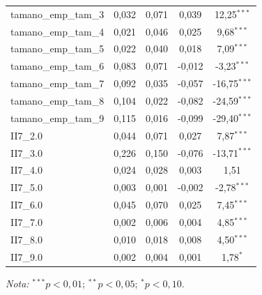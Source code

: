 \begin{table}[H]
\begin{tabular}{lcccc}
tamano\_emp\_tam\_3 & 0,032 & 0,071 & 0,039 & 12,25$^{***}$ \\
tamano\_emp\_tam\_4 & 0,021 & 0,046 & 0,025 & 9,68$^{***}$ \\
tamano\_emp\_tam\_5 & 0,022 & 0,040 & 0,018 & 7,09$^{***}$ \\
tamano\_emp\_tam\_6 & 0,083 & 0,071 & -0,012 & -3,23$^{***}$ \\
tamano\_emp\_tam\_7 & 0,092 & 0,035 & -0,057 & -16,75$^{***}$ \\
tamano\_emp\_tam\_8 & 0,104 & 0,022 & -0,082 & -24,59$^{***}$ \\
tamano\_emp\_tam\_9 & 0,115 & 0,016 & -0,099 & -29,40$^{***}$ \\
II7\_2.0 & 0,044 & 0,071 & 0,027 & 7,87$^{***}$ \\
II7\_3.0 & 0,226 & 0,150 & -0,076 & -13,71$^{***}$ \\
II7\_4.0 & 0,024 & 0,028 & 0,003 & 1,51 \\
II7\_5.0 & 0,003 & 0,001 & -0,002 & -2,78$^{***}$ \\
II7\_6.0 & 0,045 & 0,070 & 0,025 & 7,45$^{***}$ \\
II7\_7.0 & 0,002 & 0,006 & 0,004 & 4,85$^{***}$ \\
II7\_8.0 & 0,010 & 0,018 & 0,008 & 4,50$^{***}$ \\
II7\_9.0 & 0,002 & 0,004 & 0,001 & 1,78$^{*}$ \\
\bottomrule
\end{tabular}
\vspace{0.2cm}
\hspace{1cm}\parbox{\linewidth}{\footnotesize\textit{Nota:} $^{***}p<0{,}01$; $^{**}p<0{,}05$; $^{*}p<0{,}10$.}
\end{table}